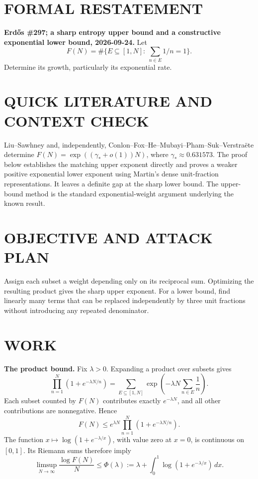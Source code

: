 \section{FORMAL RESTATEMENT}
\textbf{Erd\H{o}s \#297; a sharp entropy upper bound and a constructive exponential lower bound, 2026-09-24.}
Let
\[
F(N)=\#\{E\subseteq[1,N]:\ \sum_{n\in E}1/n=1\}.
\]
Determine its growth, particularly its exponential rate.

\section{QUICK LITERATURE AND CONTEXT CHECK}
Liu--Sawhney and, independently, Conlon--Fox--He--Mubayi--Pham--Suk--Verstra\"ete determine $F(N)=\exp((\gamma_*+o(1))N)$, where $\gamma_*\approx0.631573$. The proof below establishes the matching upper exponent directly and proves a weaker positive exponential lower exponent using Martin's dense unit-fraction representations. It leaves a definite gap at the sharp lower bound. The upper-bound method is the standard exponential-weight argument underlying the known result.

\section{OBJECTIVE AND ATTACK PLAN}
Assign each subset a weight depending only on its reciprocal sum. Optimizing the resulting product gives the sharp upper exponent. For a lower bound, find linearly many terms that can be replaced independently by three unit fractions without introducing any repeated denominator.

\section{WORK}
\textbf{The product bound.} Fix $\lambda>0$. Expanding a product over subsets gives
\[
\prod_{n=1}^N(1+e^{-\lambda N/n})
=\sum_{E\subseteq[1,N]}\exp\!\left(-\lambda N\sum_{n\in E}\frac1n\right).
\]
Each subset counted by $F(N)$ contributes exactly $e^{-\lambda N}$, and all other contributions are nonnegative. Hence
\[
F(N)\leq e^{\lambda N}\prod_{n=1}^N(1+e^{-\lambda N/n}).
\tag{1}
\]
The function $x\mapsto\log(1+e^{-\lambda/x})$, with value zero at $x=0$, is continuous on $[0,1]$. Its Riemann sums therefore imply
\[
\limsup_{N\to\infty}\frac{\log F(N)}N
\leq\Phi(\lambda):=\lambda+\int_0^1\log(1+e^{-\lambda/x})\,dx.
\tag{2}
\]

